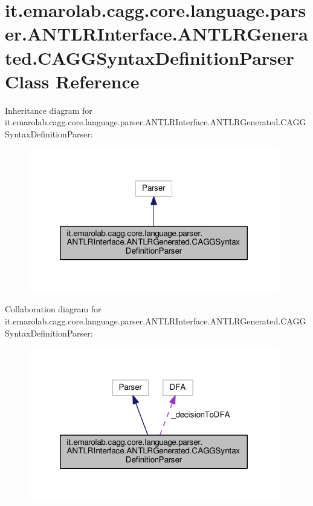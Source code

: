 \hypertarget{classit_1_1emarolab_1_1cagg_1_1core_1_1language_1_1parser_1_1ANTLRInterface_1_1ANTLRGenerated_1_1CAGGSyntaxDefinitionParser}{\section{it.\-emarolab.\-cagg.\-core.\-language.\-parser.\-A\-N\-T\-L\-R\-Interface.\-A\-N\-T\-L\-R\-Generated.\-C\-A\-G\-G\-Syntax\-Definition\-Parser Class Reference}
\label{classit_1_1emarolab_1_1cagg_1_1core_1_1language_1_1parser_1_1ANTLRInterface_1_1ANTLRGenerated_1_1CAGGSyntaxDefinitionParser}
}


Inheritance diagram for it.\-emarolab.\-cagg.\-core.\-language.\-parser.\-A\-N\-T\-L\-R\-Interface.\-A\-N\-T\-L\-R\-Generated.\-C\-A\-G\-G\-Syntax\-Definition\-Parser\-:\nopagebreak
\begin{figure}[H]
\begin{center}
\leavevmode
\includegraphics[width=310pt]{classit_1_1emarolab_1_1cagg_1_1core_1_1language_1_1parser_1_1ANTLRInterface_1_1ANTLRGenerated_1_7774152c1b60dd1e546d3dd0b3910c07}
\end{center}
\end{figure}


Collaboration diagram for it.\-emarolab.\-cagg.\-core.\-language.\-parser.\-A\-N\-T\-L\-R\-Interface.\-A\-N\-T\-L\-R\-Generated.\-C\-A\-G\-G\-Syntax\-Definition\-Parser\-:\nopagebreak
\begin{figure}[H]
\begin{center}
\leavevmode
\includegraphics[width=310pt]{classit_1_1emarolab_1_1cagg_1_1core_1_1language_1_1parser_1_1ANTLRInterface_1_1ANTLRGenerated_1_3497c4743e4fc96a525f55d13fc2a109}
\end{center}
\end{figure}
